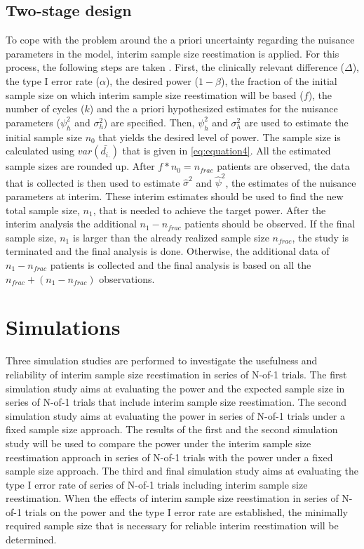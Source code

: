\documentclass[AMA,STIX1COL,]{WileyNJD-v2}
\begin{document}
\hypertarget{twostage}{%
\subsection{Two-stage design}\label{twostage}}

To cope with the problem around the a priori uncertainty regarding the nuisance parameters in the model, interim sample size reestimation is applied. For this process, the following steps are taken \citep{wittes1990, kieser2000, coffey1999}. First, the clinically relevant difference (\(\Delta\)), the type I error rate (\(\alpha\)), the desired power (\(1-\beta\)), the fraction of the initial sample size on which interim sample size reestimation will be based (\(f\)), the number of cycles (\(k\)) and the a priori hypothesized estimates for the nuisance parameters (\(\psi^2_h\) and \(\sigma^2_h\)) are specified. Then, \(\psi^2_h\) and \(\sigma^2_h\) are used to estimate the initial sample size \(n_0\) that yields the desired level of power. The sample size is calculated using \(var(\bar{d_{i.}})\) that is given in \eqref{eq:equation4}. All the estimated sample sizes are rounded up. After \(f*n_0 = n_{frac}\) patients are observed, the data that is collected is then used to estimate \(\hat{\sigma}^2\) and \(\hat{\psi}^2\), the estimates of the nuisance parameters at interim. These interim estimates should be used to find the new total sample size, \(n_1\), that is needed to achieve the target power. After the interim analysis the additional \(n_1 - n_{frac}\) patients should be observed. If the final sample size, \(n_1\) is larger than the already realized sample size \(n_{frac}\), the study is terminated and the final analysis is done. Otherwise, the additional data of \(n_1 - n_{frac}\) patients is collected and the final analysis is based on all the \(n_{frac} + (n_1-n_{frac})\) observations.

\hypertarget{simulations}{%
\section{Simulations}\label{simulations}}

Three simulation studies are performed to investigate the usefulness and reliability of interim sample size reestimation in series of N-of-1 trials. The first simulation study aims at evaluating the power and the expected sample size in series of N-of-1 trials that include interim sample size reestimation. The second simulation study aims at evaluating the power in series of N-of-1 trials under a fixed sample size approach. The results of the first and the second simulation study will be used to compare the power under the interim sample size reestimation approach in series of N-of-1 trials with the power under a fixed sample size approach. The third and final simulation study aims at evaluating the type I error rate of series of N-of-1 trials including interim sample size reestimation. When the effects of interim sample size reestimation in series of N-of-1 trials on the power and the type I error rate are established, the minimally required sample size that is necessary for reliable interim reestimation will be determined.
\end{document}

